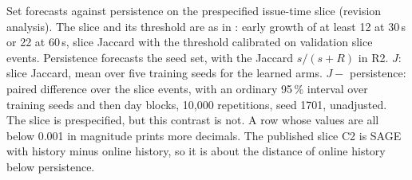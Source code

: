 \begin{table}[h]
\footnotesize
\centering
\caption{Set forecasts against persistence on the prespecified issue-time slice (revision analysis). The slice and its threshold are as in : early growth of at least 12 at 30\,s or 22 at 60\,s, slice Jaccard with the threshold calibrated on validation slice events. Persistence forecasts the seed set, with the Jaccard $s/(s+R)$ in R2. $J$: slice Jaccard, mean over five training seeds for the learned arms. $J -$ persistence: paired difference over the slice events, with an ordinary 95\,\% interval over training seeds and then day blocks, 10,000 repetitions, seed 1701, unadjusted. The slice is prespecified, but this contrast is not. A row whose values are all below 0.001 in magnitude prints more decimals. The published slice C2 is SAGE with history minus online history, so it is about the distance of online history below persistence.}
\label{tab:slice-persistence}
\setlength{\tabcolsep}{4pt}

\end{table}

